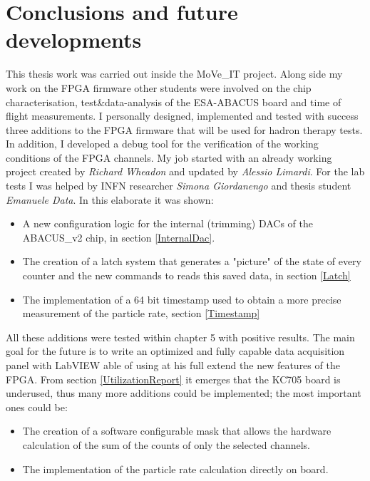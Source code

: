 


\newpage
\section*{Conclusions and future developments}
\pagestyle{plain}
\noindent This thesis work was carried out inside the MoVe\_IT project.
Along side my work on the FPGA firmware other students were involved on the chip characterisation, test\&data-analysis of the ESA-ABACUS board and time of flight measurements.
I personally designed, implemented and tested with success three additions to the FPGA firmware that will be used for hadron therapy tests.
In addition, I developed a debug tool for the verification of the working conditions of the FPGA channels.
My job started with an already working project created by \textit{Richard Wheadon} and updated by \textit{Alessio Limardi}.
For the lab tests I was helped by INFN researcher \textit{Simona Giordanengo} and thesis student \textit{Emanuele Data}.
In this elaborate it was shown:
\begin{itemize}
	\item A new configuration logic for the internal (trimming) DACs of the ABACUS\_v2 chip, in section \ref{InternalDac}.
	\item The creation of a latch system that generates a "picture" of the state of every counter and the new commands to reads this saved data, in section \ref{Latch}
	\item The implementation of a 64 bit timestamp used to obtain a more precise measurement of the particle rate, section \ref{Timestamp}
\end{itemize}
\noindent All these additions were tested within chapter 5 with positive results.
The main goal for the future is to write an optimized and fully capable data acquisition panel with LabVIEW able of using at his full extend the new features of the FPGA.  
From section \ref{UtilizationReport} it emerges that the KC705 board is underused, thus many more additions could be implemented; the most important ones could be:
\begin{itemize}
	\item The creation of a software configurable mask that allows the hardware calculation of the sum of the counts of only the selected channels.  
	\item The implementation of the particle rate calculation directly on board.
\end{itemize}


